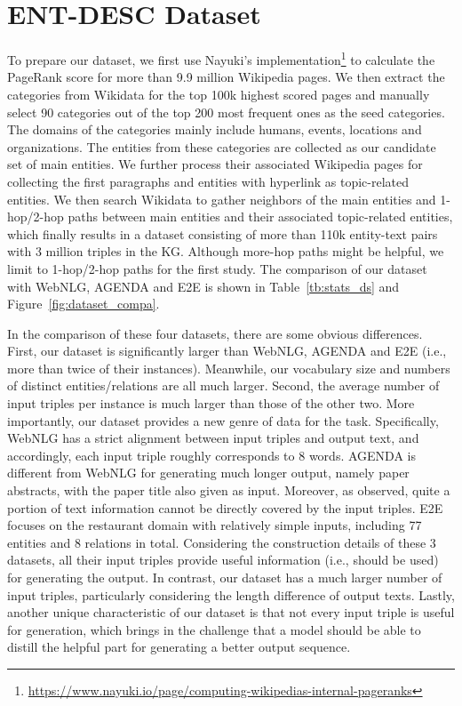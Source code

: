 \documentclass[11pt,a4paper]{article}
\begin{document}
\section{ENT-DESC Dataset}






To prepare our dataset, we first use Nayuki's implementation\footnote{\url{https://www.nayuki.io/page/computing-wikipedias-internal-pageranks}} to calculate the PageRank score for more than 9.9 million Wikipedia pages.
We then extract the categories from Wikidata for the top 100k highest scored pages and manually select 90 categories out of the top 200 most frequent ones as the seed categories. 
The domains of the categories mainly include humans, events, locations and organizations.
The entities from these categories are collected as our candidate set of main entities.
We further process their associated Wikipedia pages for collecting the first paragraphs and entities with hyperlink as topic-related entities.
We then search Wikidata to gather neighbors of the main entities and 1-hop/2-hop paths between main entities and their associated topic-related entities, which finally results in a dataset consisting of more than 110k entity-text pairs with 3 million triples in the KG.
Although more-hop paths might be helpful, we limit to 1-hop/2-hop paths for the first study.
The comparison of our dataset with WebNLG, AGENDA and E2E is shown in Table~\ref{tb:stats_ds} and Figure~\ref{fig:dataset_compa}.

In the comparison of these four datasets, there are some obvious differences. First, our dataset is significantly larger than WebNLG, AGENDA and E2E (i.e., more than twice of their instances). 
Meanwhile, our vocabulary size and numbers of distinct entities/relations are all much larger. 
Second, the average number of input triples per instance is much larger than those of the other two. 
More importantly, our dataset provides a new genre of data for the task. Specifically, WebNLG has a strict alignment between input triples and output text, and accordingly, each input triple roughly corresponds to 8 words. 
AGENDA is different from WebNLG for generating much longer output, namely paper abstracts, with the paper title also given as input.
Moreover, as observed, quite a portion of text information cannot be directly covered by the input triples. E2E focuses on the restaurant domain with relatively simple inputs, including 77 entities and 8 relations in total.
Considering the construction details of these 3 datasets, all their input triples provide useful information (i.e., should be used) for generating the output. 
In contrast, our dataset has a much larger number of input triples, particularly considering the length difference of output texts. Lastly, another unique characteristic of our dataset is that not every input triple is useful for generation, which brings in the challenge that a model should be able to distill the helpful part for generating a better output sequence.  
\end{document}
